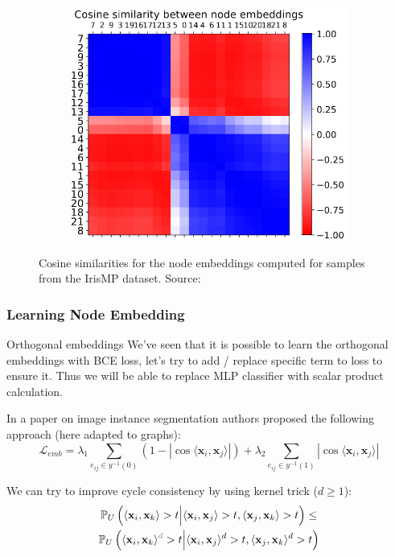 \documentclass{beamer}
\begin{document}
\begin{frame}
\begin{figure}
\begin{subfigure}{0.5\linewidth}
        \end{subfigure}
        \begin{subfigure}{0.49\linewidth}
            \centering
            \includegraphics[height=0.53\textwidth]{emb4.png}
        \end{subfigure}
        \caption{Cosine similarities for the node embeddings
            computed for samples from the IrisMP dataset.
            Source: \cite{jung2022learning}}
    \end{figure}

\end{frame}

\begin{frame}
    \frametitle{Learning Node Embedding}

    \begin{block}{Orthogonal embeddings}
        We've seen that it is possible to learn the orthogonal
        embeddings with BCE loss,
        let's try to add / replace specific term to loss
        to ensure it. Thus we will be able to replace MLP classifier with
        scalar product calculation.
    \end{block}
    In a paper \cite{chen2019instance} on image instance segmentation
    authors proposed the following approach (here adapted to graphs):
    \[
        \mathcal{L}_{emb} =
        \lambda_1 \sum\limits_{e_{ij} \in y^{-1}(0)} \left(1 - |\cos \langle \mathbf{x}_i, \mathbf{x}_j \rangle| \right) +
        \lambda_2 \sum\limits_{e_{ij} \in y^{-1}(1)} |\cos \langle \mathbf{x}_i, \mathbf{x}_j \rangle|
    \]

    We can try to improve cycle consistency by using kernel trick ($d \geq 1$):
    \begin{multline*}
        \mathbb{P}_U \left(
        \langle \mathbf{x}_{i}, \mathbf{x}_{k} \rangle > t
        \Big|
        \langle \mathbf{x}_{i}, \mathbf{x}_{j} \rangle > t,
        \langle \mathbf{x}_{j}, \mathbf{x}_{k} \rangle > t
        \right) \leq \\
        \mathbb{P}_U \left(
        \langle \mathbf{x}_{i}, \mathbf{x}_{k} \rangle^{\textcolor{gray}{d}} > t
        \Big|
        \langle \mathbf{x}_{i}, \mathbf{x}_{j} \rangle^d > t,
        \langle \mathbf{x}_{j}, \mathbf{x}_{k} \rangle^d > t
        \right)
    \end{multline*}

\end{frame}
\end{document}
